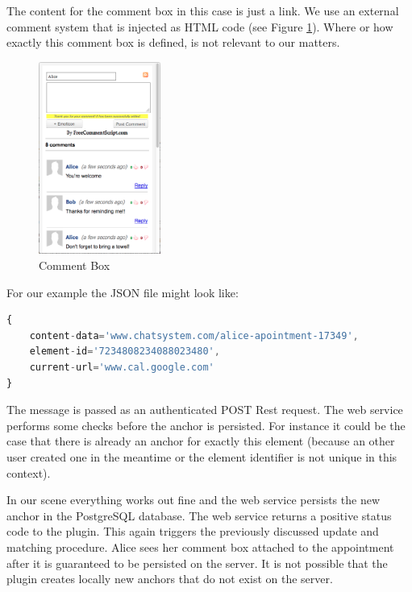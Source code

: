 The content for the comment box in this case is just a link. We use an external comment system that is injected as HTML code (see Figure \ref{gcal-commentbox}). Where or how exactly this comment box is defined, is not relevant to our matters.

\begin{figure}\centering
	\includegraphics[width=4cm]{images/gcal-commentbox.png}
\caption{Comment Box}
\label{gcal-commentbox}
\end{figure}

For our example the JSON file might look like:

\begin{lstlisting}[language=JavaScript]
{
	content-data='www.chatsystem.com/alice-apointment-17349',
	element-id='7234808234088023480',
	current-url='www.cal.google.com'
}
\end{lstlisting}

The message is passed as an authenticated POST Rest request. The web service performs some checks before the anchor is persisted. For instance it could be the case that there is already an anchor for exactly this element (because an other user created one in the meantime or the element identifier is not unique in this context). 

In our scene everything works out fine and the web service persists the new anchor in the PostgreSQL database. The web service returns a positive status code to the plugin. This again triggers the previously discussed update and matching procedure. Alice sees her comment box attached to the appointment after it is guaranteed to be persisted on the server. It is not possible that the plugin creates locally new anchors that do not exist on the server. 

